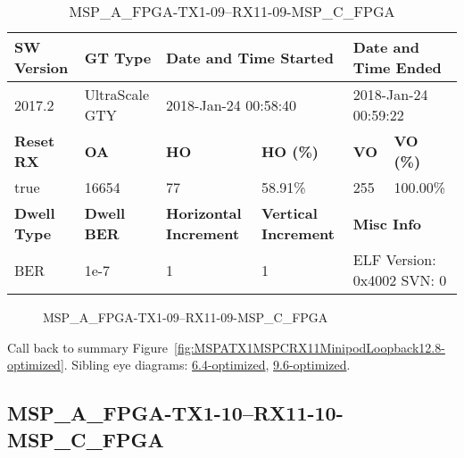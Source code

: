 \begin{table}[h]
\centering
\caption{MSP\_A\_FPGA-TX1-09--RX11-09-MSP\_C\_FPGA}
\label{tab:MSPAFPGATX109RX1109MSPCFPGA12.8-optimized}
\begin{tabular}{@{}|l|l|l|l|l|l|@{}}
\toprule
\textbf{SW Version}                & \textbf{GT Type}   & \multicolumn{2}{l|}{\textbf{Date and Time Started}}            & \multicolumn{2}{l|}{\textbf{Date and Time Ended}}        \\ \midrule
2017.2                       & UltraScale GTY          & \multicolumn{2}{l|}{2018-Jan-24 00:58:40}                   & \multicolumn{2}{l|}{2018-Jan-24 00:59:22}               \\ \midrule
\textbf{Reset RX}                  & \textbf{OA} & \textbf{HO}   & \textbf{HO (\%)} & \textbf{VO} & \textbf{VO (\%)} \\ \midrule
true & 16654        & 77          & 58.91\%        & 255        & 100.00\%       \\ \midrule
\textbf{Dwell Type}                & \textbf{Dwell BER} & \textbf{Horizontal Increment} & \textbf{Vertical Increment}    & \multicolumn{2}{l|}{\textbf{Misc Info}}                  \\ \midrule
BER                            & 1e-7        & 1        & 1           & \multicolumn{2}{l|}{ELF Version: 0x4002 SVN: 0}                         \\ \bottomrule
\end{tabular}
\end{table}

\begin{figure}[h]
\caption{MSP\_A\_FPGA-TX1-09--RX11-09-MSP\_C\_FPGA} \label{fig:MSPAFPGATX109RX1109MSPCFPGA12.8-optimized}
\end{figure}

Call back to summary Figure~\ref{fig:MSPATX1MSPCRX11MinipodLoopback12.8-optimized}.
Sibling eye diagrams: \hyperref[sec:MSPAFPGATX109RX1109MSPCFPGA6.4-optimized]{6.4-optimized}, \hyperref[sec:MSPAFPGATX109RX1109MSPCFPGA9.6-optimized]{9.6-optimized}.

\clearpage
\newpage


\subsection{MSP\_A\_FPGA-TX1-10--RX11-10-MSP\_C\_FPGA}\label{sec:MSPAFPGATX110RX1110MSPCFPGA12.8-optimized}

